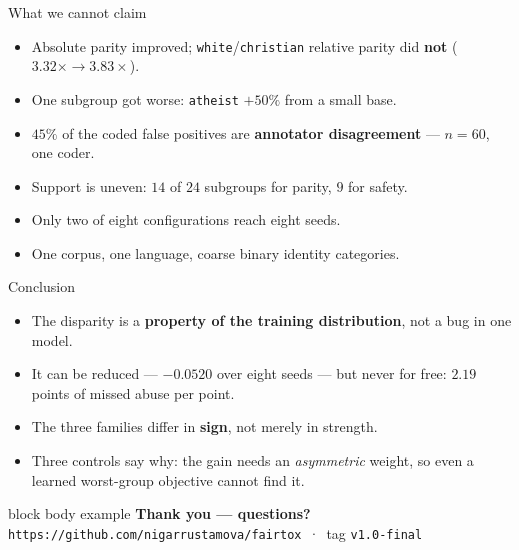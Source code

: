 \documentclass[aspectratio=169,11pt,xcolor={table}]{beamer}
\newcommand{\repourl}{https://github.com/nigarrustamova/fairtox}
\newcommand{\repotag}{v1.0-final}
\newcommand{\hint}[1]{{\footnotesize\color{fairgrey}#1}}
\begin{document}
\begin{frame}{What we cannot claim}
  \vspace{2.0ex}
  \small
  \begin{itemize}\itemsep 1.4ex
    \item Absolute parity improved; \texttt{white}/\texttt{christian} relative
      parity did \textbf{not} ($3.32\times \rightarrow 3.83\times$).
    \item One subgroup got worse: \texttt{atheist} $+50\%$ from a small base.
    \item $45\%$ of the coded false positives are \textbf{annotator
      disagreement} --- $n = 60$, one coder.
    \item Support is uneven: $14$ of $24$ subgroups for parity, $9$ for safety.
    \item Only two of eight configurations reach eight seeds.
    \item One corpus, one language, coarse binary identity categories.
  \end{itemize}
\end{frame}

\begin{frame}{Conclusion}
  \vspace{2.0ex}
  \small
  \begin{itemize}\itemsep 1.5ex
    \item The disparity is a \textbf{property of the training distribution}, not
      a bug in one model.
    \item It can be reduced --- $-0.0520$ over eight seeds --- but never for
      free: $2.19$ points of missed abuse per point.
    \item The three families differ in \textbf{sign}, not merely in strength.
    \item Three controls say why: the gain needs an \emph{asymmetric} weight, so
      even a learned worst-group objective cannot find it.
  \end{itemize}

  \vspace{2.2ex}
  \begin{beamercolorbox}[wd=\textwidth,sep=1.1ex,rounded=true]%
    {block body example}%
    \centering\small\textbf{Thank you --- questions?}\\[0.3ex]
    \hint{\texttt{\repourl} \,·\, tag \texttt{\repotag}}%
  \end{beamercolorbox}
\end{frame}
\end{document}
